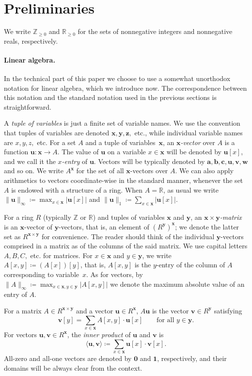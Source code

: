 \documentclass{article}
\renewcommand{\geq}{\geqslant}
\newcommand{\Z}{\mathbb{Z}}
\newcommand{\Zn}{\Z_{\geq 0}}
\newcommand{\R}{\mathbb{R}}
\newcommand{\myRn}{\R_{\geq 0}} %
\newcommand{\tup}[1]{{\mathbf{#1}}}
\newcommand{\xx}{\tup x}
\newcommand{\ww}{\tup w}
\newcommand{\yy}{\tup y}
\newcommand{\zz}{\tup z}
\newcommand{\av}{\tup a}
\newcommand{\bb}{\tup b}
\newcommand{\cc}{\tup c}
\newcommand{\uu}{\tup u}
\newcommand{\myvv}{\tup v} %
\newcommand{\matrices}[3]{#1^{#2\times #3}}
\newcommand{\zero}{\tup 0}
\newcommand{\sca}[2]{\langle #1,#2\rangle}
\begin{document}
\section{Preliminaries}

We write $\Zn$ and $\myRn$ for the sets of nonnegative integers and nonnegative reals, respectively.

\paragraph*{Linear algebra.} In the technical part of this paper we choose to use a somewhat unorthodox notation for linear algebra, which we introduce now. The correspondence between this notation and the standard notation used in the previous sections is straightforward.

A {\em{tuple of variables}} is just a finite set of variable names. We use the convention that tuples of variables are denoted $\xx,\yy,\zz,$ etc., while individual variable names are $x,y,z,$ etc. For a set $A$ and a tuple of variables~$\xx$, an {\em{$\xx$-vector}} over $A$ is a function $\uu\colon \xx\to A$.
The value of $\uu$ on a variable $x\in \xx$ will be denoted by $\uu[x]$, and we call it the {\em{$x$-entry}} of $\uu$.
Vectors will be typically denoted by $\av,\bb,\cc,\uu,\myvv,\ww$ and so on. We write $A^{\xx}$ for the set of all $\xx$-vectors over $A$.
We can also apply arithmetics to vectors coordinate-wise in the standard manner, whenever the set $A$ is endowed with a structure of a ring. When $A=\R$, as usual we write
$\|\uu\|_\infty\coloneqq \max_{x\in \xx} |\uu[x]|$ and $\|\uu\|_1\coloneqq \sum_{x\in \xx} |\uu[x]|$.

For a ring $R$ (typically $\Z$ or $\R$) and tuples of variables $\tup x$ and $\tup y$, an {\em{$\tup x\times \tup y$-matrix}} is an $\tup x$-vector of $\tup y$-vectors, that is, an element of $(R^{\tup y})^{\tup x}$; we denote the latter set as $\matrices{R}{\xx}{\yy}$ for convenience.
The reader should think of the individual $\yy$-vectors comprised in a matrix as of the columns of the said matrix. We use capital letters $A,B,C,$ etc. for matrices. For $x\in \xx$ and $y\in \yy$, we write $A[x,y]\coloneqq (A[x])[y]$, that is, $A[x,y]$ is the $y$-entry of the column of $A$ corresponding to variable~$x$. As for vectors, by $\|A\|_{\infty}\coloneqq \max_{x\in \xx,y\in \yy} |A[x,y]|$ we denote the maximum absolute value of an entry of $A$.

For a matrix $A\in \matrices{R}{\xx}{\yy}$ and a vector $\uu\in R^{\xx}$, $A\uu$ is the vector $\myvv\in R^{\yy}$ satisfying
$$\myvv[y]=\sum_{x\in \xx} A[x,y]\cdot \uu[x]\qquad\textrm{for all }y\in \yy.$$
For vectors $\uu,\myvv\in R^{\xx}$, the {\em{inner product}} of $\uu$ and $\myvv$ is
$$\sca{\uu}{\myvv}\coloneqq \sum_{x\in \xx} \uu[x]\cdot \myvv[x].$$
All-zero and all-one vectors are denoted by $\zero$ and $\tup 1$, respectively, and their domains will be always clear from the context.
\end{document}
